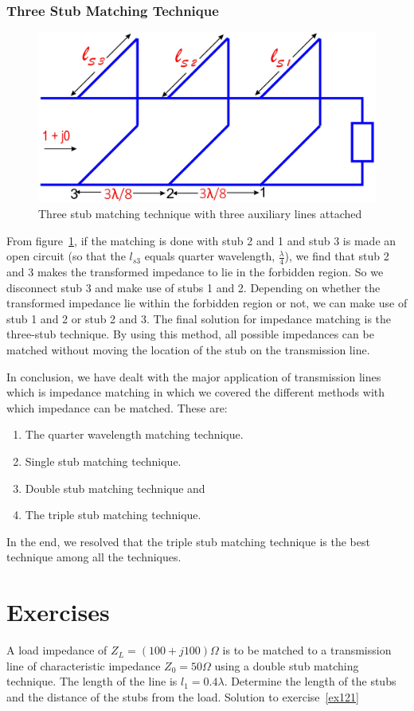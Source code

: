 \subsubsection{Three Stub Matching Technique}
\begin{figure}[h]
\centering
\includegraphics[width=1\linewidth]{./graphics/fig13}
\caption{Three stub matching technique with three auxiliary lines attached}
\label{fig:fig13}
\end{figure}

From figure~\ref{fig:fig13}, if the matching is done with stub 2 and 1 and stub 3 is made an open circuit (so that the $ l_{s3}$ equals quarter wavelength, $\frac{\lambda}{4}$), we find that stub 2 and 3 makes the transformed impedance to lie in the forbidden region. So we disconnect stub 3 and make use of stubs 1 and 2. Depending on whether the transformed impedance lie within the forbidden region or not, we can make use of stub 1 and 2 or stub 2 and 3. The final solution for impedance matching is the three-stub technique. By using this method, all possible impedances can be matched without moving the location of the stub on the transmission line.

In conclusion, we have dealt with the major application of transmission lines which is impedance matching in which we covered the different methods with which impedance can be matched. These are:
\begin{enumerate}
\item The quarter wavelength matching technique.
\item Single stub matching technique.
\item Double stub matching technique and
\item The triple stub matching technique.
\end{enumerate}

In the end, we resolved that the triple stub matching technique is the best technique among all the techniques.

\section*{Exercises}
\begin{ExerciseList}
\Exercise[label={ex121}]
A load impedance of $Z_{L} = (100 + j100)\Omega$ is to be matched to a transmission line of characteristic impedance $Z_0 = 50\Omega$ using a double stub matching technique. The length of the line is $l_{1} = 0.4\lambda$. Determine the length of the stubs and the distance of the stubs from the load.
\Answer
Solution to exercise~\ref{ex121}
\end{ExerciseList}

